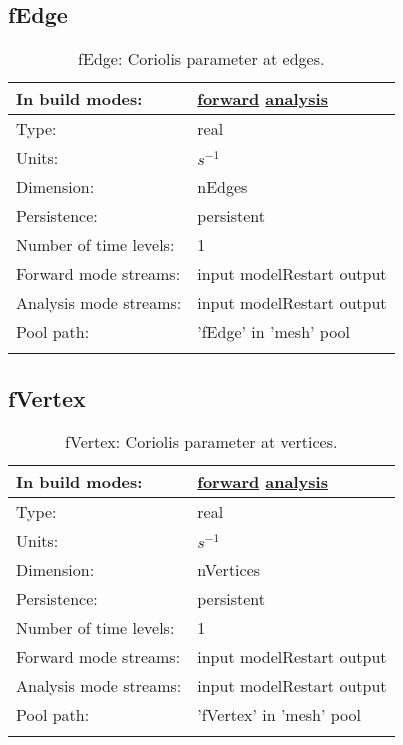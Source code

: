 \subsection[fEdge]{fEdge}
\label{subsec:var_sec_mesh_fEdge}
\begin{center}
\begin{longtable}{| p{2.0in} | p{4.0in} |}
        \hline 
        In build modes: & \hyperref[subsec:forward_var_tab_mesh]{forward} \hyperref[subsec:analysis_var_tab_mesh]{analysis} \\
        \hline 
        Type: & real \\
        \hline 
        Units: & $s^{-1}$ \\
        \hline 
        Dimension: & nEdges \\
        \hline 
        Persistence: & persistent \\
        \hline 
        Number of time levels: & 1 \\
        \hline 
		 Forward mode streams: &  input modelRestart output \\
        \hline 
		 Analysis mode streams: &  input modelRestart output \\
        \hline 
            Pool path: & 'fEdge' in 'mesh' pool
 \\
		 \hline 
    \caption{fEdge: Coriolis parameter at edges.}
\end{longtable}
\end{center}
\subsection[fVertex]{fVertex}
\label{subsec:var_sec_mesh_fVertex}
\begin{center}
\begin{longtable}{| p{2.0in} | p{4.0in} |}
        \hline 
        In build modes: & \hyperref[subsec:forward_var_tab_mesh]{forward} \hyperref[subsec:analysis_var_tab_mesh]{analysis} \\
        \hline 
        Type: & real \\
        \hline 
        Units: & $s^{-1}$ \\
        \hline 
        Dimension: & nVertices \\
        \hline 
        Persistence: & persistent \\
        \hline 
        Number of time levels: & 1 \\
        \hline 
		 Forward mode streams: &  input modelRestart output \\
        \hline 
		 Analysis mode streams: &  input modelRestart output \\
        \hline 
            Pool path: & 'fVertex' in 'mesh' pool
 \\
		 \hline 
    \caption{fVertex: Coriolis parameter at vertices.}
\end{longtable}
\end{center}
